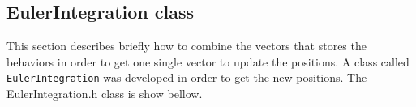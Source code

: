






\subsection{EulerIntegration class}
This section describes briefly how to combine the vectors that stores the behaviors in order to get one single vector to update the positions. A class called \texttt{EulerIntegration} was developed in order to get the new positions. The {EulerIntegration.h} class is show bellow.

